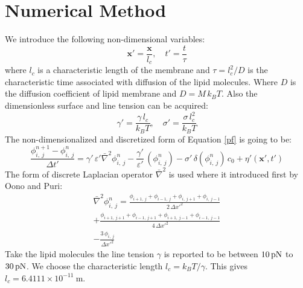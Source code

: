 \documentclass[english,12pt]{article}
\begin{document}
\section{Numerical Method}
We introduce the following non-dimensional variables:
\begin{equation*}
\mathbf{x}'=\frac{\mathbf{x}}{l_c}, \quad t'=\frac{t}{\tau}
\end{equation*}
where $l_c$ is a characteristic length of the membrane and $\tau=l_c^2/D$ is the characteristic time associated with diffusion of the lipid molecules. Where $D$ is the diffusion coefficient of lipid membrane and $D=M\,k_B T$. Also the dimensionless surface and line tension can be acquired:
\begin{equation*}
\gamma'=\frac{\gamma\,l_c}{k_B T}, \quad \sigma'=\frac{\sigma\,l_c^2}{k_B T}
\end{equation*}
 The non-dimensionalized and discretized form of Equation \ref{pf} is going to be:
\begin{equation}
	\frac{\phi^{n+1}_{i,\ j}-\phi^{n}_{i,\ j}}{\Delta{t'}}={\gamma'}\,{\varepsilon'}\bar{\nabla}^2\phi^{n}_{i,\ j}-\frac{{\gamma}'}{\varepsilon'}
\,(\phi^{n}_{i,\ j})-{\sigma}'\,\delta(\phi^{n}_{i,\ j})\,c_0+{\eta}'(\mathbf{{x'}},{t'})
\end{equation}
The form of discrete Laplacian operator $\bar{\nabla}^2$ is used where it introduced first by Oono and Puri:
\begin{equation}
\begin{split}
\bar{\nabla}^2{\phi^{n}_{i,\ j}}=\frac{\phi_{i+1,\ j}+\phi_{i-1,\ j}+\phi_{i,\ j+1}+\phi_{i,\ j-1}}{2\,{\Delta x'}^{2}}\\
+\frac{\phi_{i+1,\ j+1}+\phi_{i-1,\ j+1}+\phi_{i+1,\ j-1}+\phi_{i-1,\ j-1}}{4\,{\Delta x'}^{2}}\\
-\frac{3\,\phi_{i,\ j}}{{\Delta x'}^2}
\end{split}
\end{equation}
Take the lipid molecules the line tension $\gamma$ is reported to be between $\unit[10]{pN}$ to $\unit[30]{pN}$. We choose the characteristic length $l_c=k_B T/\gamma$. This gives $l_c=6.4111\times 10^{-11}\ \text{m}$.
\end{document}
